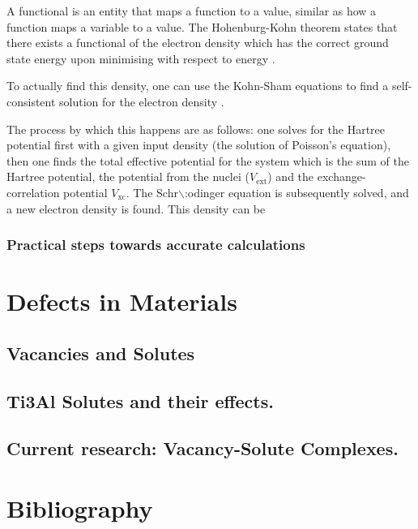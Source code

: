 \documentclass[11pt]{article}
\begin{document}
A functional is an entity that maps a function to a value, similar as how a function maps a
variable to a value. The Hohenburg-Kohn theorem states that there exists a functional of the
electron density which has the correct ground state energy upon minimising with respect to
energy \cite{hohenburg64_inhomog_electron_gas}. 

To actually find this density, one can use the Kohn-Sham equations to find a self-consistent
solution for the electron density \cite{kohn65_self_cons_eq}. 

The process by which this happens are as follows: one solves for the Hartree potential first with a
given input density (the solution of Poisson's equation), then one finds the total effective potential
for the system which is the sum of the Hartree potential, the potential from the nuclei
(\(V_{\text{ext}}\)) and the exchange-correlation potential \(V_{\text{xc}}\). The Schr$\backslash$:odinger
equation is subsequently solved, and a new electron density is found. This density can be





\subsubsection{Practical steps towards accurate calculations}
\label{sec:orgf91dd60}



\section{Defects in Materials}
\label{sec:orgce39476}

\subsection{Vacancies and Solutes}
\label{sec:org2eb0d84}

\subsection{Ti3Al Solutes and their effects.}
\label{sec:orgac0ce46}

\subsection{Current research: Vacancy-Solute Complexes.}
\label{sec:orgdfded82}


\section{Bibliography}
\label{sec:org44b2d18}
\label{org9d4da5b}



\end{document}
